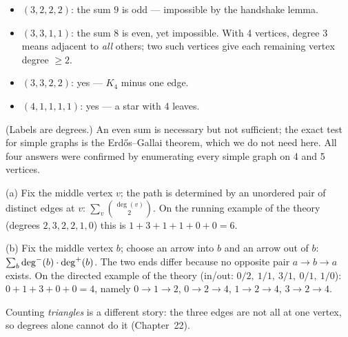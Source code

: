 \begin{solutionbox}
\begin{itemize}[leftmargin=*]
    \item[(a)] $(3,2,2,2)$: the sum $9$ is odd --- impossible by the handshake lemma.
    \item[(b)] $(3,3,1,1)$: the sum $8$ is even, yet impossible. With 4 vertices, degree 3 means adjacent to \emph{all} others; two such vertices give each remaining vertex degree $\ge 2$.
    \item[(c)] $(3,3,2,2)$: yes --- $K_4$ minus one edge.
    \item[(d)] $(4,1,1,1,1)$: yes --- a star with 4 leaves.
\end{itemize}
\begin{center}
\end{center}
(Labels are degrees.) An even sum is necessary but not sufficient; the exact test for simple graphs is the Erd\H{o}s--Gallai theorem, which we do not need here. All four answers were confirmed by enumerating every simple graph on 4 and 5 vertices.
\end{solutionbox}

\begin{solutionbox}
(a) Fix the middle vertex $v$; the path is determined by an unordered pair of distinct edges at $v$: $\sum_v \binom{\deg(v)}{2}$. On the running example of the theory (degrees $2,3,2,2,1,0$) this is $1+3+1+1+0+0 = 6$.

(b) Fix the middle vertex $b$; choose an arrow into $b$ and an arrow out of $b$: $\sum_b \deg^{-}(b)\cdot\deg^{+}(b)$. The two ends differ because no opposite pair $a \to b \to a$ exists. On the directed example of the theory (in/out: $0/2,\ 1/1,\ 3/1,\ 0/1,\ 1/0$): $0 + 1 + 3 + 0 + 0 = 4$, namely $0{\to}1{\to}2$, $0{\to}2{\to}4$, $1{\to}2{\to}4$, $3{\to}2{\to}4$.

Counting \emph{triangles} is a different story: the three edges are not all at one vertex, so degrees alone cannot do it (Chapter~22).
\end{solutionbox}

